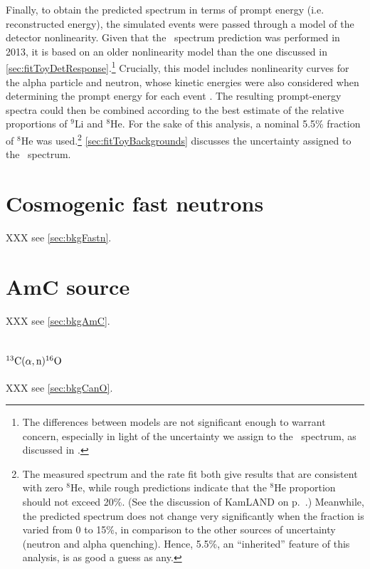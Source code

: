 \documentclass[../thesis.tex]{subfiles}
\begin{document}
Finally, to obtain the predicted spectrum in terms of prompt energy (i.e. reconstructed energy), the simulated events were passed through a model of the detector nonlinearity. Given that the \LiHe\ spectrum prediction was performed in 2013, it is based on an older nonlinearity model than the one discussed in \autoref{sec:fitToyDetResponse}.\footnote{The differences between models are not significant enough to warrant concern, especially in light of the uncertainty we assign to the \LiHe\ spectrum, as discussed in \cite{berkeley_toymc}.} Crucially, this model includes nonlinearity curves for the alpha particle and neutron, whose kinetic energies were also considered when determining the prompt energy for each event \cite{bcwNonlin}. The resulting prompt-energy spectra could then be combined according to the best estimate of the relative proportions of $^9$Li and $^8$He. For the sake of this analysis, a nominal 5.5\% fraction of $^8$He was used.\footnote{The measured spectrum and the rate fit both give results that are consistent with zero $^8$He, while rough predictions indicate that the $^8$He proportion should not exceed 20\%. (See the discussion of KamLAND on p.~\pageref{par:kamland_he8}.) Meanwhile, the predicted spectrum does not change very significantly when the fraction is varied from 0 to 15\%, in comparison to the other sources of uncertainty (neutron and alpha quenching). Hence, 5.5\%, an ``inherited'' feature of this analysis, is as good a guess as any.} \autoref{sec:fitToyBackgrounds} discusses the uncertainty assigned to the \LiHe\ spectrum.

\section{Cosmogenic fast neutrons}
\label{sec:bkgFastnOverview}

XXX see \autoref{sec:bkgFastn}.


\section{AmC source}
\label{sec:bkgAmCOverview}

XXX see \autoref{sec:bkgAmC}.


\section{$^{13}\mathrm{C}(\alpha, \mathrm{n})^{16}\mathrm{O}$}
\label{sec:bkgCanOOverview}

XXX see \autoref{sec:bkgCanO}.
\end{document}
